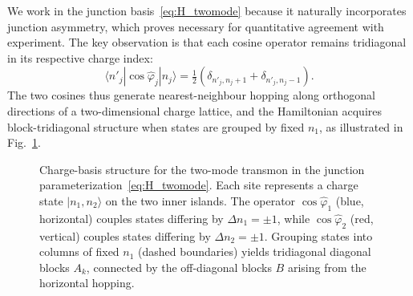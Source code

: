 \documentclass[reprint, floatfix, superscriptaddress, amsmath, amssymb, longbibliography]{revtex4-2}
\begin{document}
We work in the junction basis~\eqref{eq:H_twomode} because it naturally incorporates junction asymmetry, which proves necessary for quantitative agreement with experiment. The key observation is that each cosine operator remains tridiagonal in its respective charge index:
\begin{equation}
\langle n'_j | \cos\hat{\varphi}_j | n_j \rangle = \tfrac{1}{2}(\delta_{n'_j, n_j+1} + \delta_{n'_j, n_j-1}).
\end{equation}
The two cosines thus generate nearest-neighbour hopping along orthogonal directions of a two-dimensional charge lattice, and the Hamiltonian acquires block-tridiagonal structure when states are grouped by fixed $n_1$, as illustrated in Fig.~\ref{fig:charge_lattice}.

\begin{figure}[t]
\centering
{}
\caption{Charge-basis structure for the two-mode transmon in the junction parameterization~\eqref{eq:H_twomode}. Each site represents a charge state $|n_1, n_2\rangle$ on the two inner islands. The operator $\cos\hat{\varphi}_1$ (blue, horizontal) couples states differing by $\Delta n_1 = \pm 1$, while $\cos\hat{\varphi}_2$ (red, vertical) couples states differing by $\Delta n_2 = \pm 1$. Grouping states into columns of fixed $n_1$ (dashed boundaries) yields tridiagonal diagonal blocks ${A}_k$, connected by the off-diagonal blocks ${B}$ arising from the horizontal hopping.}
\label{fig:charge_lattice}
\end{figure}
\end{document}
